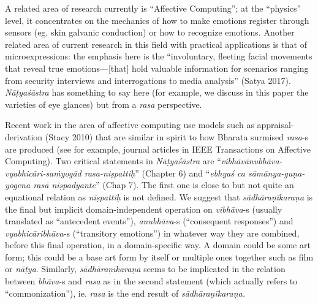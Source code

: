 A related area of research currently is “Affective Computing”; at the “physics” level, it concentrates on the mechanics of how to make emotions register through sensors (eg. skin galvanic conduction) or how to recognize emotions. Another related area of current research in this field with practical applications is that of microexpressions: the emphasis here is the “involuntary, fleeting facial movements that reveal true emotions—[that] hold valuable information for scenarios ranging from security interviews and interrogations to media analysis” (Satya 2017). \textsl{Nāṭyaśāstra} has something to say here (for example, we discuss in this paper the varieties of eye glances) but from a \textsl{rasa} perspective.

Recent work in the area of affective computing use models such as appraisal-derivation (Stacy 2010) that are similar in spirit to how Bharata surmised \textsl{rasa}-s are produced (see for example, journal articles in IEEE Transactions on Affective Computing). Two critical statements in \textsl{Nāṭyaśāstra} are “\textsl{vibhāvānubhāva-vyabhicāri-saṁyogād rasa-niṣpattiḥ}” (Chapter 6) and “\textsl{ebhyaś ca sāmānya-guṇa-yogena rasā niṣpadyante}” (Chap 7). The first one is close to but not quite an equational relation as \textsl{niṣpattiḥ} is not defined. We suggest that \textsl{sādhāraṇīkaraṇa} is the final but implicit domain-independent operation on \textsl{vibhāva}-s (usually translated as “antecedent events”), \textsl{anubhāva}-s (“consequent responses”) and \textsl{vyabhicāribhāva}-s (“transitory emotions”) in whatever way they are combined, before this final operation, in a domain-specific way. A domain could be some art form; this could be a base art form by itself or multiple ones together such as film or \textsl{nāṭya}. Similarly, \textsl{sādhāraṇīkaraṇa} seems to be implicated in the relation between \textsl{bhāva}-s and \textsl{rasa} as in the second statement (which actually refers to “commonization”), ie. \textsl{rasa} is the end result of \textsl{sādhāraṇīkaraṇa.}

